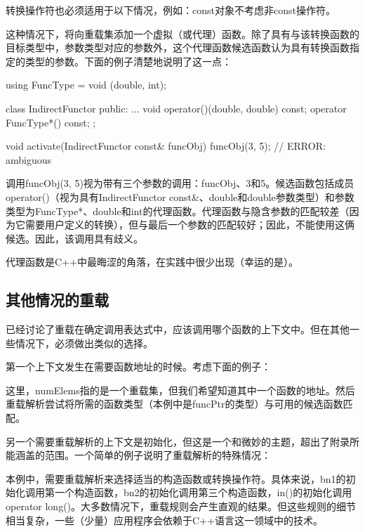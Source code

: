 \begin{notice}
转换操作符也必须适用于以下情况，例如：const对象不考虑非const操作符。
\end{notice}

这种情况下，将向重载集添加一个虚拟（或代理）函数。除了具有与该转换函数的目标类型中，参数类型对应的参数外，这个代理函数候选函数认为具有转换函数指定的类型的参数。下面的例子清楚地说明了这一点：

\begin{cpp}
using FuncType = void (double, int);

class IndirectFunctor {
	public:
	...
	void operator()(double, double) const;
	operator FuncType*() const;
};

void activate(IndirectFunctor const& funcObj) {
	funcObj(3, 5); // ERROR: ambiguous
}
\end{cpp}

调用funcObj(3, 5)视为带有三个参数的调用：funcObj、3和5。候选函数包括成员operator()（视为具有IndirectFunctor const\&、double和double参数类型）和参数类型为FuncType*、double和int的代理函数。代理函数与隐含参数的匹配较差（因为它需要用户定义的转换），但与最后一个参数的匹配较好；因此，不能使用这俩候选。因此，该调用具有歧义。

代理函数是C++中最晦涩的角落，在实践中很少出现（幸运的是）。

\subsection{其他情况的重载}

已经讨论了重载在确定调用表达式中，应该调用哪个函数的上下文中。但在其他一些情况下，必须做出类似的选择。

第一个上下文发生在需要函数地址的时候。考虑下面的例子：


这里，numElems指的是一个重载集，但我们希望知道其中一个函数的地址。然后重载解析尝试将所需的函数类型（本例中是funcPtr的类型）与可用的候选函数匹配。

另一个需要重载解析的上下文是初始化，但这是一个和微妙的主题，超出了附录所能涵盖的范围。一个简单的例子说明了重载解析的特殊情况：


本例中，需要重载解析来选择适当的构造函数或转换操作符。具体来说，bn1的初始化调用第一个构造函数，bn2的初始化调用第三个构造函数，in()的初始化调用operator long()。大多数情况下，重载规则会产生直观的结果。但这些规则的细节相当复杂，一些（少量）应用程序会依赖于C++语言这一领域中的技术。













